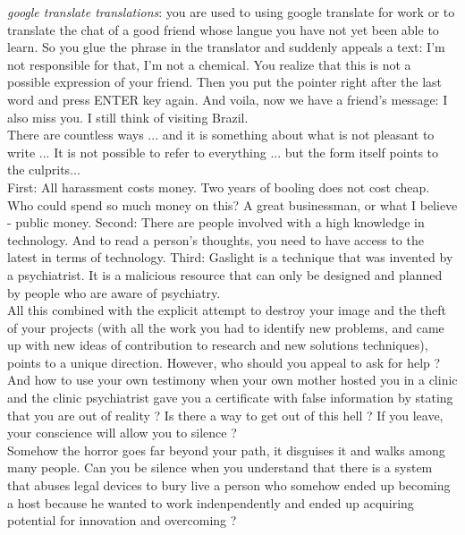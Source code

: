 \documentclass[11pt]{book}
\begin{document}
\emph{google translate translations}: you are used to using google translate for work or to translate the chat of a good friend whose langue you have not yet been able to learn. So you glue the phrase in the translator and suddenly appeals a text: I'm not responsible for that, I'm not a chemical. You realize that this is not a possible expression of your friend. Then you put the pointer right after the last word and press ENTER key again. And voila, now we have a friend's message: I also miss you. I still think of visiting Brazil. \\

\noindent There are countless ways ... and it is something about what is not pleasant to write ... It is not possible to refer to everything ... but the form itself points to the culprits... \\

\noindent First: All harassment costs money. Two years of booling does not cost cheap. Who could spend so much money on this? A great businessman, or what I believe - public money. Second: There are people involved with a high knowledge in technology. And to read a person's thoughts, you need to have access to the latest in terms of technology. Third: Gaslight is a technique that was invented by a psychiatrist. It is a malicious resource that can only be designed and planned by people who are aware of psychiatry. \\

\noindent All this combined with the explicit attempt to destroy your image and the theft of your projects (with all the work you had to identify new problems, and came up with new ideas of contribution to research and new solutions techniques), points to a unique direction. However, who should you appeal to ask for help ? And how to use your own testimony when your own mother hosted you in a clinic and the clinic psychiatrist gave you a certificate with false information by stating that you are out of reality ? Is there a way to get out of this hell ? If you leave, your conscience will allow you to silence ? \\

\noindent Somehow the horror goes far beyond your path, it disguises it and walks among many people. Can you be silence when you understand that there is a system that abuses legal devices to bury live a person who somehow ended up becoming a host because he wanted to work indenpendently and ended up acquiring potential for innovation and overcoming ? \\
\end{document}

